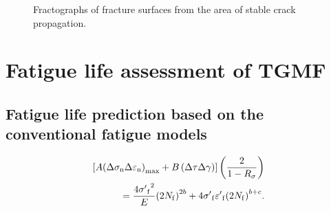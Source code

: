 \documentclass[preprint,5p,twocolumn,11pt,sort&compress]{elsarticle}
\begin{document}
\begin{figure}[htbp]
  \caption{Fractographs of fracture surfaces from the area of stable crack propagation.}
  \label{Fig:fatigue_striations_TGMF}
\end{figure}

\newpage
\section{Fatigue life assessment of TGMF}
\subsection{Fatigue life prediction based on the conventional fatigue models}

\begin{equation}
\begin{aligned}
\left[ {A{{\left( {\Delta {\sigma _{\rm n}}\Delta {\varepsilon _{\rm n}}} \right)}_{\max }} + B\left( {\Delta \tau \Delta \gamma } \right)} \right]\left( {\frac{2}{{1 - {R_\sigma }}}} \right)\\
= \frac{{4{{\sigma '}_{\rm f}}^2}}{E}{\left( {2{N_{\rm f}}} \right)^{2b}} + 4{{\sigma '}_{\rm f}}{{\varepsilon '}_{\rm f}}{\left( {2{N_{\rm f}}} \right)^{b + c}}.
\end{aligned}
\label{Equ:TMF_model}
\end{equation}
\end{document}
